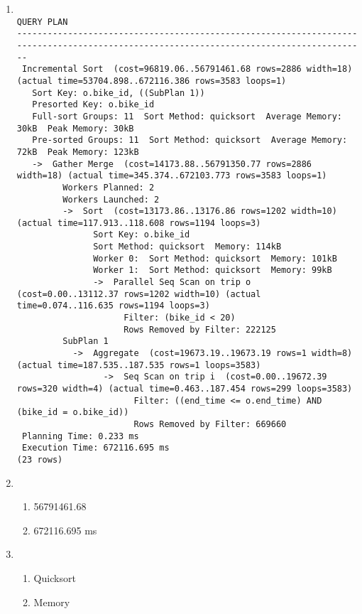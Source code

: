 \documentclass{homework}
\begin{document}
\begin{enumerate}[start=2]
    \item \begin{verbatim}
                                                               QUERY PLAN
----------------------------------------------------------------------------------------------------------------------------------------
 Incremental Sort  (cost=96819.06..56791461.68 rows=2886 width=18) (actual time=53704.898..672116.386 rows=3583 loops=1)
   Sort Key: o.bike_id, ((SubPlan 1))
   Presorted Key: o.bike_id
   Full-sort Groups: 11  Sort Method: quicksort  Average Memory: 30kB  Peak Memory: 30kB
   Pre-sorted Groups: 11  Sort Method: quicksort  Average Memory: 72kB  Peak Memory: 123kB
   ->  Gather Merge  (cost=14173.88..56791350.77 rows=2886 width=18) (actual time=345.374..672103.773 rows=3583 loops=1)
         Workers Planned: 2
         Workers Launched: 2
         ->  Sort  (cost=13173.86..13176.86 rows=1202 width=10) (actual time=117.913..118.608 rows=1194 loops=3)
               Sort Key: o.bike_id
               Sort Method: quicksort  Memory: 114kB
               Worker 0:  Sort Method: quicksort  Memory: 101kB
               Worker 1:  Sort Method: quicksort  Memory: 99kB
               ->  Parallel Seq Scan on trip o  (cost=0.00..13112.37 rows=1202 width=10) (actual time=0.074..116.635 rows=1194 loops=3)
                     Filter: (bike_id < 20)
                     Rows Removed by Filter: 222125
         SubPlan 1
           ->  Aggregate  (cost=19673.19..19673.19 rows=1 width=8) (actual time=187.535..187.535 rows=1 loops=3583)
                 ->  Seq Scan on trip i  (cost=0.00..19672.39 rows=320 width=4) (actual time=0.463..187.454 rows=299 loops=3583)
                       Filter: ((end_time <= o.end_time) AND (bike_id = o.bike_id))
                       Rows Removed by Filter: 669660
 Planning Time: 0.233 ms 
 Execution Time: 672116.695 ms
(23 rows)
\end{verbatim}

    \item \begin{enumerate}
        \item 56791461.68
        \item 672116.695 ms
    \end{enumerate}

    \item \begin{enumerate}
        \item Quicksort
        \item Memory
    \end{enumerate}


\end{enumerate}
\end{document}
